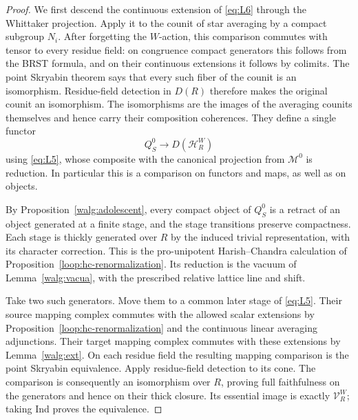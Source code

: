 \begin{proof}
We first descend the continuous extension of \eqref{eq:L6} through
the Whittaker projection.  Apply it to the counit of star averaging
by a compact subgroup \(N_i\).  After forgetting the \(W\)-action,
this comparison commutes with tensor to every residue field:
on congruence compact generators this follows from the BRST formula,
and on their continuous extensions it follows by colimits.  The
point Skryabin theorem says that every such fiber of the counit is
an isomorphism.  Residue-field detection in \(D(R)\) therefore makes
the original counit an isomorphism.  The isomorphisms are the images
of the averaging counits themselves and hence carry their composition
coherences.  They define a single functor
\[
 Q_S^0\longrightarrow D(\mathcal H_R^W)
\]
using \eqref{eq:L5}, whose composite with the canonical projection
from \(\mathcal M^0\) is reduction.  In particular this is a
comparison on functors and maps, as well as on objects.

By Proposition~\ref{walg:adolescent}, every compact object of
\(Q_S^0\) is a retract of an object generated at a finite stage,
and the stage transitions preserve compactness.  Each stage is
thickly generated over \(R\) by the induced trivial representation,
with its character correction.  This is the pro-unipotent
Harish--Chandra calculation of
Proposition~\ref{loop:hc-renormalization}.  Its reduction is the
vacuum of Lemma~\ref{walg:vacua}, with the prescribed relative lattice
line and shift.

Take two such generators.  Move them to a common later stage of
\eqref{eq:L5}.  Their source mapping complex commutes with the allowed
scalar extensions by Proposition~\ref{loop:hc-renormalization}
and the continuous linear averaging adjunctions.  Their target
mapping complex commutes with these extensions by
Lemma~\ref{walg:ext}.  On each residue field the resulting mapping
comparison is the point Skryabin equivalence.  Apply residue-field
detection to its cone.  The comparison is consequently an
isomorphism over \(R\), proving full faithfulness on the generators
and hence on their thick closure.  Its essential image is exactly
\(\mathcal V_R^W\); taking Ind proves the equivalence.


\end{proof}
